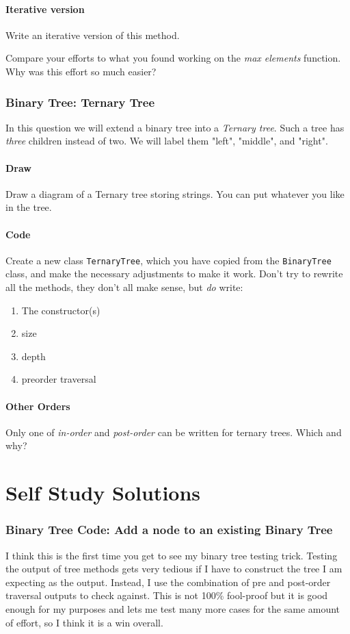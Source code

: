 \documentclass[twoside=false,DIV=14]{scrartcl}
\begin{document}
\subsection{Iterative version}
Write an iterative version of this method.

Compare your efforts to what you found working on the \emph{max elements} function.  Why was this effort so much easier?

\section{Binary Tree: Ternary Tree}
In this question we will extend a binary tree into a \emph{Ternary tree}.  Such a tree has \emph{three} children instead of two.  We will label them "left", "middle", and "right".
\subsection{Draw}
Draw a diagram of a Ternary tree storing strings.  You can put whatever you like in the tree.

\subsection{Code}
Create a new class \verb|TernaryTree|, which you have copied from the \verb|BinaryTree| class, and make the necessary adjustments to make it work.  Don't try to rewrite all the methods, they don't all make sense, but \emph{do} write:
\begin{enumerate}
\item The constructor(s)
\item size
\item depth
\item preorder traversal
\end{enumerate}

\subsection{Other Orders}
Only one of \emph{in-order} and \emph{post-order} can be written for ternary trees.  Which and why?

\newpage\setcounter{section}{0}
\part*{Self Study Solutions}

\section{Binary Tree Code: Add a node to an existing Binary Tree}
I think this is the first time you get to see my binary tree testing trick.  Testing the output of tree methods gets very tedious if I have to construct the tree I am expecting as the output.  Instead, I use the combination of pre and post-order traversal outputs to check against.  This is not 100\% fool-proof but it is good enough for my purposes and lets me test many more cases for the same amount of effort, so I think it is a win overall.
\end{document}
